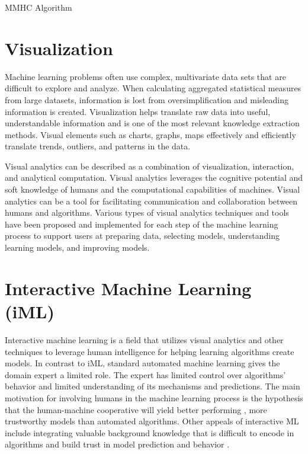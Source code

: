 \begin{algorithm}
\caption{MMHC Algorithm}\label{PC}
\begin{algorithmic}[1]
\EndFor
{}
\EndProcedure
\end{algorithmic}
\end{algorithm}

\section{Visualization}
\indent Machine learning problems often use complex, multivariate data sets that are difficult to explore and analyze. When calculating aggregated statistical measures from large datasets, information is lost from oversimplification and misleading information is created. Visualization helps translate raw data into useful, understandable information and is one of the most relevant knowledge extraction methods. Visual elements such as charts, graphs, maps effectively and efficiently translate trends, outliers, and patterns in the data.

Visual analytics can be described as a combination of visualization, interaction, and analytical computation. Visual analytics leverages the cognitive potential and soft knowledge of humans and the computational capabilities of machines. Visual analytics can be a tool for facilitating communication and collaboration between humans and algorithms. Various types of visual analytics techniques and tools have been proposed and implemented for each step of the machine learning process to support users at preparing data, selecting models, understanding learning models, and improving models. 

\section{Interactive Machine Learning (iML)}
Interactive machine learning is a field that utilizes visual analytics and other techniques to leverage human intelligence for helping learning algorithms create models. In contrast to iML, standard automated machine learning gives the domain expert a limited role. The expert has limited control over algorithms' behavior and limited understanding of its mechanisms and predictions. The main motivation for involving humans in the machine learning process is the hypothesis that the human-machine cooperative will yield better performing \cite{InteractiveML}, more trustworthy models than automated algorithms. Other appeals of interactive ML include integrating valuable background knowledge that is difficult to encode in algorithms and build trust in model prediction and behavior \cite{InteractiveML}. 

